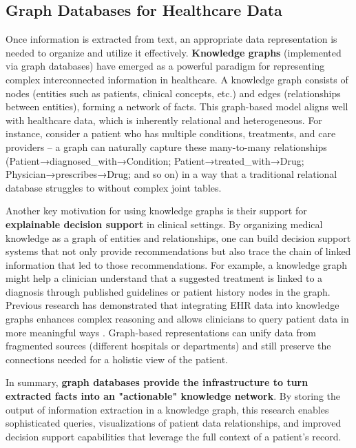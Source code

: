 \subsection{Graph Databases for Healthcare Data}

Once information is extracted from text, an appropriate data representation is needed to organize and utilize it effectively. \textbf{Knowledge graphs} (implemented via graph databases) have emerged as a powerful paradigm for representing complex interconnected information in healthcare. A knowledge graph consists of nodes (entities such as patients, clinical concepts, etc.) and edges (relationships between entities), forming a network of facts. This graph-based model aligns well with healthcare data, which is inherently relational and heterogeneous. For instance, consider a patient who has multiple conditions, treatments, and care providers – a graph can naturally capture these many-to-many relationships (Patient→diagnosed\_with→Condition; Patient→treated\_with→Drug; Physician→prescribes→Drug; and so on) in a way that a traditional relational database struggles to without complex joint tables.

Another key motivation for using knowledge graphs is their support for \textbf{explainable decision support} in clinical settings. By organizing medical knowledge as a graph of entities and relationships, one can build decision support systems that not only provide recommendations but also trace the chain of linked information that led to those recommendations. For example, a knowledge graph might help a clinician understand that a suggested treatment is linked to a diagnosis through published guidelines or patient history nodes in the graph. Previous research has demonstrated that integrating EHR data into knowledge graphs enhances complex reasoning and allows clinicians to query patient data in more meaningful ways \parencite{Rotmensch2017}. Graph-based representations can unify data from fragmented sources (different hospitals or departments) and still preserve the connections needed for a holistic view of the patient.

In summary, \textbf{graph databases provide the infrastructure to turn extracted facts into an "actionable" knowledge network}. By storing the output of information extraction in a knowledge graph, this research enables sophisticated queries, visualizations of patient data relationships, and improved decision support capabilities that leverage the full context of a patient's record.

